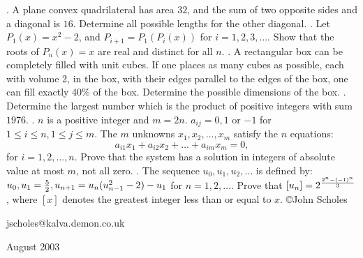 \nopagenumbers
{}
\vskip 25pt
. A plane convex quadrilateral has area $32$, and the sum of two opposite sides and a diagonal is $16$. Determine all possible lengths for the other diagonal.
\vskip 12pt
. Let $P_1(x)=x^2-2$, and $P_{i+1}=P_1(P_i(x))$ for $i=1,2,3,\ldots$. Show that the roots of $P_n(x)=x$ are real and distinct for all $n$.
\vskip 12pt
. A rectangular box can be completely filled with unit cubes. If one places as many cubes as possible, each with volume 2, in the box, with their edges parallel to the edges of the box, one can fill exactly 40\% of the box. Determine the possible dimensions of the box.
\vskip 12pt
. Determine the largest number which is the product of positive integers with sum $1976$.
\vskip 12pt
. $n$ is a positive integer and $m=2n$. $a_{ij}=0,1$ or $-1$ for $1\le i\le n,1\le j\le m$. The $m$ unknowns $x_1,x_2,\ldots,x_m$ satisfy the $n$ equations: $$a_{i1}x_1+a_{i2}x_2+\ldots+a_{im}x_m=0,$$ for $i=1,2,\ldots,n$. Prove that the system has a solution in integers of absolute value at most $m$, not all zero.
\vskip 12pt
. The sequence $u_0,u_1,u_2,\ldots$ is defined by: $u_0,u_1={5\over2},u_{n+1}=u_n(u_{n-1}^2-2)-u_1$ for $n=1,2,\ldots$. Prove that $[u_n]=2^{2^n-(-1)^n\over3}$, where $[x]$ denotes the greatest integer less than or equal to $x$.
\vskip 20pt
\noindent \copyright John Scholes

\noindent jscholes@kalva.demon.co.uk

 August 2003

\bye
